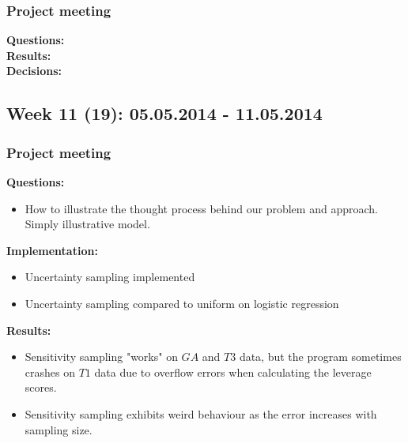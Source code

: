 \subsubsection*{Project meeting}
\textbf{Questions:}\\


\textbf{Results:}\\

\textbf{Decisions:}\\




\subsection*{Week 11 (19): 05.05.2014 - 11.05.2014}
\subsubsection*{Project meeting}
\textbf{Questions:}\\
\begin{itemize}
\item How to illustrate the thought process behind our problem and  approach. Simply illustrative model.
\end{itemize}

\textbf{Implementation:}\\
\begin{itemize}
\item Uncertainty sampling implemented
\item Uncertainty sampling compared to uniform on logistic regression
\end{itemize}

\textbf{Results:}\\
\begin{itemize}
\item Sensitivity sampling "works" on $GA$ and $T3$ data, but the program sometimes crashes on $T1$ data due to overflow errors when calculating the leverage scores.
\item Sensitivity sampling exhibits weird behaviour as the error increases with sampling size.
\end{itemize}


